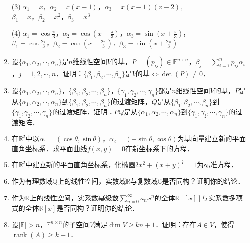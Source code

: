 \documentclass[a4paper,fontset=windows]{ctexbook}
\theoremstyle{definition}
\DeclareMathOperator{\rank}{rank}
\renewcommand{\ge}{\geqslant}
\begin{document}
\begin{enumerate}
(3) $\alpha_1=x$，$\alpha_2=x(x-1)$，$\alpha_3=x(x-1)(x-2)$，\\ \hspace*{18pt}$\beta_1=x$，$\beta_2=x^2$，$\beta_3=x^3$

(4) $\alpha_1=\cos\frac{\pi}{3}$，$\alpha_2=\cos(x+\frac{\pi}{3})$，$\alpha_3=\sin(x+\frac{\pi}{3})$，\\ \hspace*{18pt}$\beta_1=\cos\frac{2\pi}{3}$，$\beta_2=\cos(x+\frac{2\pi}{3})$，$\beta_3=\sin(x+\frac{2\pi}{3})$

\item 设$\{\alpha_1,\alpha_2,\cdots,\alpha_n\}$是$n$维线性空间$V$的基，$P=(p_{ij})\in\mathbb{F}^{n\times n}$，$\beta_j=\sum\limits_{i=1}^np_{ij}\alpha_i$，$j=1,2,\cdots,n$．证明：$\{\beta_1,\beta_2,\cdots,\beta_n\}$是$V$的基$\Leftrightarrow\det(P)\ne 0$．

\item 设$\{\alpha_1,\alpha_2,\cdots,\alpha_n\}$，$\{\beta_1,\beta_2,\cdots,\beta_n\}$，$\{\gamma_1,\gamma_2,\cdots,\gamma_n\}$都是$n$维线性空间$V$的基，$P$是从$\{\alpha_1,\alpha_2,\cdots,\alpha_n\}$到$\{\beta_1,\beta_2,\cdots,\beta_n\}$的过渡矩阵，$Q$是从$\{\beta_1,\beta_2,\cdots,\beta_n\}$到$\{\gamma_1,\gamma_2,\cdots,\gamma_n\}$的过渡矩阵．证明：$PQ$是从$\{\alpha_1,\alpha_2,\cdots,\alpha_n\}$到$\{\gamma_1,\gamma_2,\cdots,\gamma_n\}$的过渡矩阵．

\item 在$\mathbb{R}^2$中以$\alpha_1=(\cos\theta,\sin\theta)$，$\alpha_2=(-\sin\theta,\cos\theta)$为基向量建立新的平面直角坐标系．求平面曲线$f(x,y)=0$在新坐标系下的方程．

\item 在$\mathbb{R}^2$中建立新的平面直角坐标系，化椭圆$2x^2+(x+y)^2=1$为标准方程．

\item 作为有理数域$\mathbb{Q}$上的线性空间，实数域$\mathbb{R}$与复数域$\mathbb{C}$是否同构？证明你的结论．

\item 作为$\mathbb{R}$上的线性空间，实系数幂级数$\sum\limits_{n=0}^\infty a_nx^n$的全体$\mathbb{R}[[x]]$与实系数多项式的全体$\mathbb{R}[x]$是否同构？证明你的结论．

\item 设$|\mathbb{F}|>n$，$\mathbb{F}^{n\times n}$的子空间$V$满足$\dim V\ge kn+1$．证明：存在$A\in V$，使得$\rank(A)\ge k+1$．



\end{enumerate}
\end{document}
